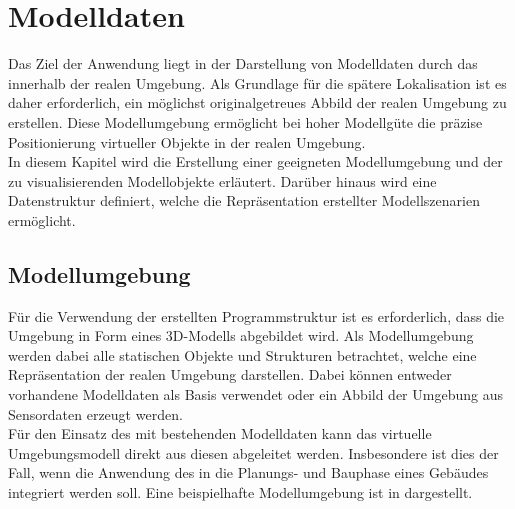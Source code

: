 \chapter{Modelldaten}
\label{chap.modeldata}

Das Ziel der Anwendung liegt in der Darstellung von Modelldaten durch das \kps{} innerhalb der realen Umgebung. Als Grundlage für die spätere Lokalisation ist es daher erforderlich, ein möglichst originalgetreues Abbild der realen Umgebung zu erstellen. Diese Modellumgebung ermöglicht bei hoher Modellgüte die präzise Positionierung virtueller Objekte in der realen Umgebung.\\
In diesem Kapitel wird die Erstellung einer geeigneten Modellumgebung und der zu visualisierenden Modellobjekte erläutert. Darüber hinaus wird eine Datenstruktur definiert, welche die Repräsentation erstellter Modellszenarien ermöglicht.


\section{Modellumgebung}
\label{chap.slam}
Für die Verwendung der erstellten Programmstruktur ist es erforderlich, dass die Umgebung in Form eines 3D-Modells abgebildet wird. Als Modellumgebung werden dabei alle statischen Objekte und Strukturen betrachtet, welche eine Repräsentation der realen Umgebung darstellen. Dabei können entweder vorhandene Modelldaten als Basis verwendet oder ein Abbild der Umgebung aus Sensordaten erzeugt werden.\\

Für den Einsatz des  mit bestehenden Modelldaten kann das virtuelle Umgebungsmodell direkt aus diesen abgeleitet werden. Insbesondere ist dies der Fall, wenn die Anwendung des  in die Planungs- und Bauphase eines Gebäudes integriert werden soll. Eine beispielhafte Modellumgebung ist in  dargestellt.\\

